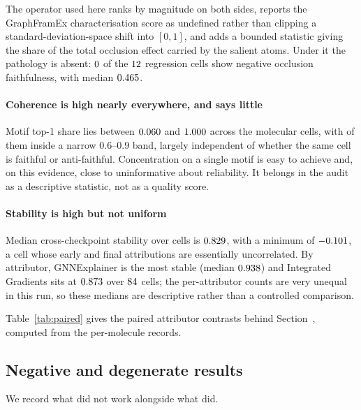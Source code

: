 The operator used here ranks by magnitude on both sides, reports the
GraphFramEx characterisation score as undefined rather than clipping a
standard-deviation-space shift into $[0,1]$, and adds a bounded statistic
giving the share of the total occlusion effect carried by the salient atoms.
Under it the pathology is absent: $0{}$ of the $12{}$ regression
cells show negative occlusion faithfulness, with median $0.465{}$.

\paragraph{Coherence is high nearly everywhere, and says little} Motif top-1
share lies between $0.060{}$ and $1.000{}$ across the
\nMolecularCells{} molecular cells, with \nMotifInBand{} of them inside a
narrow $0.6$--$0.9$ band, largely independent of whether the same cell is
faithful or anti-faithful. Concentration on a single motif is easy to achieve
and, on this evidence, close to uninformative about reliability. It belongs in
the audit as a descriptive statistic, not as a quality score.

\paragraph{Stability is high but not uniform} Median cross-checkpoint stability
over \nStabilityCells{} cells is $0.829{}$, with a minimum of
$-0.101{}$, a cell whose early and final attributions are essentially
uncorrelated. By attributor, GNNExplainer is the most stable
(median $0.938{}$) and Integrated Gradients sits at $0.873{}$ over
$84{}$ cells; the per-attributor counts are very unequal in this run, so
these medians are descriptive rather than a controlled comparison.

Table~\ref{tab:paired} gives the paired attributor contrasts behind
Section~, computed from the per-molecule records.

\subsection{Negative and degenerate results}
\label{sec:negative}

We record what did not work alongside what did.

